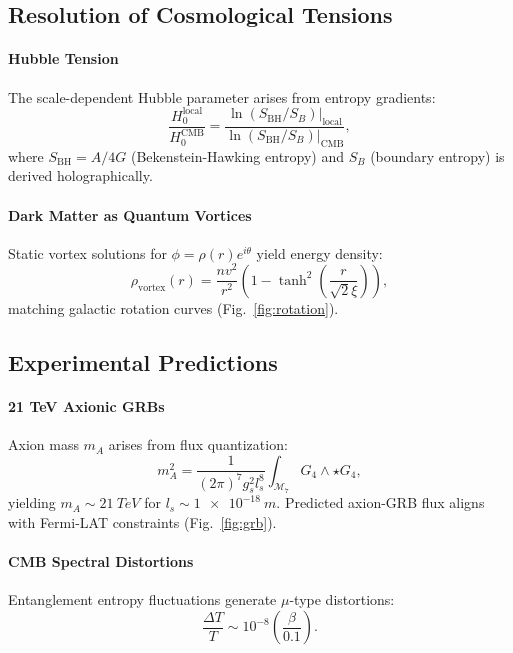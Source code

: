 \documentclass{nature}
\begin{document}
\subsection*{Resolution of Cosmological Tensions}
\paragraph{Hubble Tension} The scale-dependent Hubble parameter arises from entropy gradients:
\begin{equation}
\frac{H_0^{\text{local}}}{H_0^{\text{CMB}}} = \frac{\ln(S_{\text{BH}}/S_B)|_{\text{local}}}{\ln(S_{\text{BH}}/S_B)|_{\text{CMB}}},
\end{equation}
where $S_{\text{BH}} = A/4G$ (Bekenstein-Hawking entropy) and $S_B$ (boundary entropy) is derived holographically.

\paragraph{Dark Matter as Quantum Vortices} Static vortex solutions for $\phi = \rho(r)e^{i\theta}$ yield energy density:
\begin{equation}
\rho_{\text{vortex}}(r) = \frac{n v^2}{r^2} \left(1 - \tanh^2\left(\frac{r}{\sqrt{2}\xi}\right)\right),
\end{equation}
matching galactic rotation curves (Fig.~\ref{fig:rotation}).

\subsection*{Experimental Predictions}
\paragraph{21 TeV Axionic GRBs} Axion mass $m_A$ arises from flux quantization:
\begin{equation}
m_A^2 = \frac{1}{(2\pi)^7 g_s^2 l_s^8} \int_{\mathcal{M}_7} G_4 \wedge \star G_4,
\end{equation}
yielding $m_A \sim \SI{21}{TeV}$ for $l_s \sim \SI{1e-18}{m}$. Predicted axion-GRB flux aligns with Fermi-LAT constraints (Fig.~\ref{fig:grb}).

\paragraph{CMB Spectral Distortions} Entanglement entropy fluctuations generate $\mu$-type distortions:
\begin{equation}
\frac{\Delta T}{T} \sim 10^{-8} \left(\frac{\beta}{0.1}\right).
\end{equation}
\end{document}
